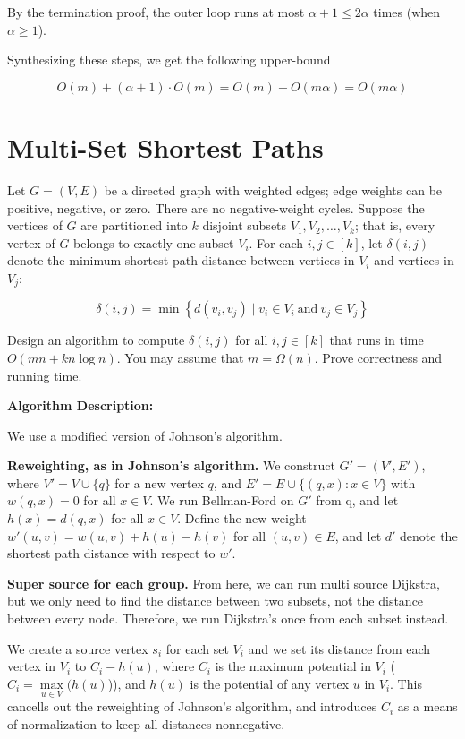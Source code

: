 \documentclass[11pt]{article}
\newcommand{\union}{\cup}
\begin{document}
By the termination proof, the outer loop runs at most $\alpha + 1 \leq 2 \alpha$ times (when $\alpha \geq 1$).

Synthesizing these steps, we get the following upper-bound

$$O(m) + (\alpha + 1) \cdot O(m) = O(m) + O(m \alpha) = O(m \alpha)$$

\section{Multi-Set Shortest Paths}
Let $G = (V, E)$ be a directed graph with weighted edges; edge weights can be positive, negative, or zero. There are no negative-weight cycles. 
Suppose the vertices of $G$ are partitioned into $k$ disjoint subsets $V_1, V_2, \dots, V_k$; that is, 
every vertex of $G$ belongs to exactly one subset $V_i$. For each $i, j \in [k]$, let $\delta(i, j)$ 
denote the minimum shortest-path distance between vertices in $V_i$ and vertices in $V_j$:

$$\delta(i,j) = \min \left\{d(v_i, v_j) \mid v_i \in V_i\ \text{and}\ v_j \in V_j\right\}$$

Design an algorithm to compute $\delta(i,j)$ for all $i,j \in [k]$ that runs in time $O(mn + kn\log n)$. You may assume that $m = \Omega(n)$. 
Prove correctness and running time.

\bigbreak

\textbf{Algorithm Description:}

We use a modified version of Johnson's algorithm. 

\textbf{Reweighting, as in Johnson’s algorithm.} 
We construct $G' = (V', E')$, where $V' = V \union \{q\}$ for a new vertex $q$, and $E' = E \union \{(q, x) : x \in V\}$ with $w(q, x) = 0$ 
for all $x \in V$. We run Bellman-Ford on $G'$ from q, and let $h(x) = d(q, x)$ for all $x \in V$. Define the new weight $w'(u, v) = w(u, v) + h(u) - h(v)$
for all $(u, v) \in E$, and let $d'$ denote the shortest path distance with respect to $w'$.

\textbf{Super source for each group.} 
From here, we can run multi source Dijkstra, but we only need to find the distance between two subsets, not the distance between every node. 
Therefore, we run Dijkstra's once from each subset instead.

We create a source vertex $s_i$ for each set $V_i$ and we set its distance from each vertex in $V_i$ to $C_i - h(u)$, 
where $C_i$ is the maximum potential in $V_i$ ($C_i = \underset{u \in V}{\max}(h(u)$)), and $h(u)$ is the potential of any vertex $u$ in $V_i$. 
This cancells out the reweighting of Johnson's algorithm, and introduces $C_i$ as a means of normalization to keep 
all distances nonnegative. 
\end{document}
